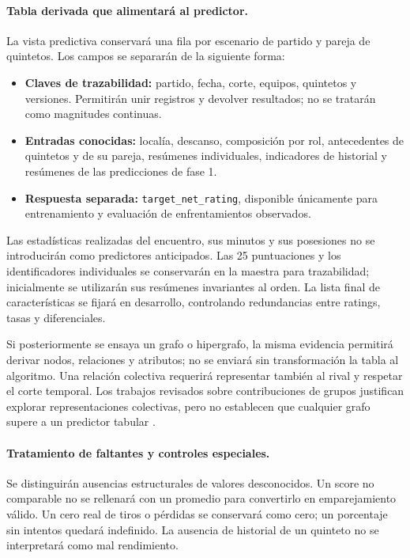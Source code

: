 \paragraph*{Tabla derivada que alimentará al predictor.}
La vista predictiva conservará una fila por escenario de partido y pareja de quintetos. Los campos se separarán de la siguiente forma:
\begin{itemize}
\item \textbf{Claves de trazabilidad:} partido, fecha, corte, equipos, quintetos y versiones. Permitirán unir registros y devolver resultados; no se tratarán como magnitudes continuas.
\item \textbf{Entradas conocidas:} localía, descanso, composición por rol, antecedentes de quintetos y de su pareja, resúmenes individuales, indicadores de historial y resúmenes de las predicciones de fase 1.
\item \textbf{Respuesta separada:} \texttt{target\_net\_rating}, disponible únicamente para entrenamiento y evaluación de enfrentamientos observados.
\end{itemize}

Las estadísticas realizadas del encuentro, sus minutos y sus posesiones no se introducirán como predictores anticipados. Las 25 puntuaciones y los identificadores individuales se conservarán en la maestra para trazabilidad; inicialmente se utilizarán sus resúmenes invariantes al orden. La lista final de características se fijará en desarrollo, controlando redundancias entre ratings, tasas y diferenciales.

Si posteriormente se ensaya un grafo o hipergrafo, la misma evidencia permitirá derivar nodos, relaciones y atributos; no se enviará sin transformación la tabla al algoritmo. Una relación colectiva requerirá representar también al rival y respetar el corte temporal. Los trabajos revisados sobre contribuciones de grupos justifican explorar representaciones colectivas, pero no establecen que cualquier grafo supere a un predictor tabular \cite{josephs2025hypergraphadjustedplusminus}.

\paragraph*{Tratamiento de faltantes y controles especiales.}
Se distinguirán ausencias estructurales de valores desconocidos. Un score no comparable no se rellenará con un promedio para convertirlo en emparejamiento válido. Un cero real de tiros o pérdidas se conservará como cero; un porcentaje sin intentos quedará indefinido. La ausencia de historial de un quinteto no se interpretará como mal rendimiento.

